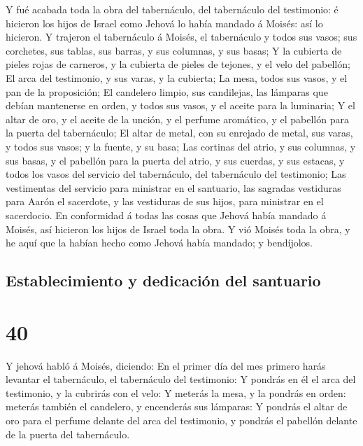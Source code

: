  Y fué acabada toda la obra del tabernáculo, del
tabernáculo del testimonio: é hicieron los hijos de Israel como Jehová
lo había mandado á Moisés: así lo hicieron.  Y trajeron el
tabernáculo á Moisés, el tabernáculo y todos sus vasos; sus corchetes,
sus tablas, sus barras, y sus columnas, y sus basas;  Y la
cubierta de pieles rojas de carneros, y la cubierta de pieles de
tejones, y el velo del pabellón;  El arca del testimonio, y
sus varas, y la cubierta;  La mesa, todos sus vasos, y el
pan de la proposición;  El candelero limpio, sus
candilejas, las lámparas que debían mantenerse en orden, y todos sus
vasos, y el aceite para la luminaria;  Y el altar de oro, y
el aceite de la unción, y el perfume aromático, y el pabellón para la
puerta del tabernáculo;  El altar de metal, con su enrejado
de metal, sus varas, y todos sus vasos; y la fuente, y su basa;
 Las cortinas del atrio, y sus columnas, y sus basas, y el
pabellón para la puerta del atrio, y sus cuerdas, y sus estacas, y todos
los vasos del servicio del tabernáculo, del tabernáculo del testimonio;
 Las vestimentas del servicio para ministrar en el
santuario, las sagradas vestiduras para Aarón el sacerdote, y las
vestiduras de sus hijos, para ministrar en el sacerdocio. 
En conformidad á todas las cosas que Jehová había mandado á Moisés, así
hicieron los hijos de Israel toda la obra.  Y vió Moisés
toda la obra, y he aquí que la habían hecho como Jehová había mandado; y
bendíjolos.

\hypertarget{establecimiento-y-dedicaciuxf3n-del-santuario}{%
\subsection{Establecimiento y dedicación del
santuario}\label{establecimiento-y-dedicaciuxf3n-del-santuario}}

\hypertarget{section-39}{%
\section{40}\label{section-39}}

 Y jehová habló á Moisés, diciendo:  En el
primer día del mes primero harás levantar el tabernáculo, el tabernáculo
del testimonio:  Y pondrás en él el arca del testimonio, y
la cubrirás con el velo:  Y meterás la mesa, y la pondrás en
orden: meterás también el candelero, y encenderás sus lámparas:
 Y pondrás el altar de oro para el perfume delante del arca
del testimonio, y pondrás el pabellón delante de la puerta del
tabernáculo.

